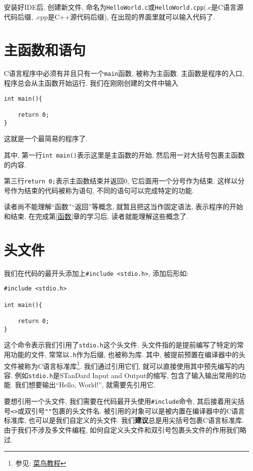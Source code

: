         安装好IDE后, 创建新文件, 命名为\texttt{HelloWorld.c}或\texttt{HelloWorld.cpp}(.c是C语言源代码后缀, .cpp是C++源代码后缀), 在出现的界面里就可以输入代码了.

    \section{主函数和语句} \label{主函数和语句}
        C语言程序中必须有并且只有一个\texttt{main}函数, 被称为主函数. 主函数是程序的入口, 程序总会从主函数开始运行. 我们在刚刚创建的文件中输入
\begin{lstlisting}
int main(){

    return 0;
}
\end{lstlisting}
        这就是一个最简易的程序了.

        其中, 第一行\texttt{int main()}表示这里是主函数的开始, 然后用一对大括号包裹主函数的内容.

        第三行\texttt{return 0;}表示主函数结束并返回0, 它后面用一个分号作为结束. 这样以分号作为结束的代码被称为语句, 不同的语句可以完成特定的功能.

        读者尚不能理解``函数''``返回''等概念, 就暂且把这当作固定语法, 表示程序的开始和结束. 在完成第\ref{函数}章的学习后, 读者就能理解这些概念了.

    \section{头文件} \label{头文件}
        我们在代码的最开头添加上\texttt{\#include <stdio.h>}, 添加后形如:
\begin{lstlisting}
#include <stdio.h>

int main(){

    return 0;
}
\end{lstlisting}

        这个命令表示我们引用了\texttt{stdio.h}这个头文件. 头文件指的是提前编写了特定的常用功能的文件, 常常以\texttt{.h}作为后缀, 也被称为库. 其中, 被提前预置在编译器中的头文件被称为C语言标准库\footnote{参见: \href{https://www.runoob.com/cprogramming/c-standard-library.html}{菜鸟教程}}. 我们通过引用它们, 就可以直接使用其中预先编写的内容. 例如\texttt{stdio.h}是STanDard Input and Output的缩写, 包含了输入输出常用的功能. 我们想要输出``Hello, World!'', 就需要先引用它.

        要想引用一个头文件, 我们需要在代码最开头使用\texttt{\#include}命令, 其后接着用尖括号\texttt{<>}或双引号\texttt{""}包裹的头文件名. 被引用的对象可以是被内置在编译器中的C语言标准库, 也可以是我们自定义的头文件. 我们\textbf{建议}总是用尖括号包裹C语言标准库. 由于我们不涉及多文件编程, 如何自定义头文件和双引号包裹头文件的作用我们略过.

